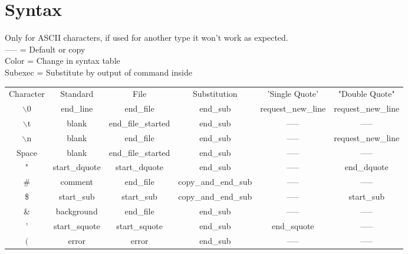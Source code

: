 \documentclass[12pt,a4paper]{report}
\begin{document}
\part{Syntax}
\noindent Only for ASCII characters, if used for another type it won't work as expected.\\
----- = Default or copy\\
Color = Change in syntax table\\
\textcolor[HTML]{C500FF}{Subexec} = Substitute by output of command inside
\begin{table}[H]
\begin{tabular}{ |c|c|c|c|c|c| }
	\hline
	\rowcolor{lightgray} \multicolumn{6}{|c|}{Syntax Table} \\
	\hline
	Character & Standard & File \cellcolor[HTML]{BEE9F9}& Substitution \cellcolor[HTML]{FFF49C}& 'Single Quote' \cellcolor[HTML]{E1E1E1} & "Double Quote"\cellcolor[HTML]{C8F3BE} \\
	\hline
	$\backslash$0 & end\_line & end\_file \cellcolor[HTML]{BEE9F9}&  end\_sub \cellcolor[HTML]{FFF49C}& request\_new\_line & request\_new\_line \\
	$\backslash$t & blank & end\_file\_started \cellcolor[HTML]{BEE9F9}&  end\_sub \cellcolor[HTML]{FFF49C}& ----- & ----- \\
	$\backslash$n & blank & end\_file \cellcolor[HTML]{BEE9F9}&  end\_sub \cellcolor[HTML]{FFF49C}& ----- & request\_new\_line \\
	Space & blank & end\_file\_started \cellcolor[HTML]{BEE9F9}&  end\_sub\cellcolor[HTML]{FFF49C} & ----- & ----- \\
	" & start\_dquote \cellcolor[HTML]{C8F3BE}& start\_dquote \cellcolor[HTML]{C8F3BE}&  end\_sub\cellcolor[HTML]{FFF49C} & ----- & end\_dquote \cellcolor[HTML]{C8F3BE}\\
	\# & comment & end\_file \cellcolor[HTML]{BEE9F9}& copy\_and\_end\_sub \cellcolor[HTML]{FFF49C}& ----- & ----- \\
	\$ & start\_sub \cellcolor[HTML]{FFF49C}& start\_sub \cellcolor[HTML]{FFF49C} & copy\_and\_end\_sub \cellcolor[HTML]{FFF49C}& ----- & start\_sub \cellcolor[HTML]{FFF49C} \\
	\& & background & end\_file \cellcolor[HTML]{BEE9F9}&  end\_sub\cellcolor[HTML]{FFF49C} & ----- & ----- \\
	' & start\_squote \cellcolor[HTML]{E1E1E1}& start\_squote \cellcolor[HTML]{E1E1E1}&  end\_sub\cellcolor[HTML]{FFF49C} & end\_squote \cellcolor[HTML]{E1E1E1} & ----- \\
	$($ & error \cellcolor[HTML]{FF0044}& error \cellcolor[HTML]{FF0044} & end\_sub \cellcolor[HTML]{FFF49C}& ----- & ----- \\

\end{tabular}
\end{table}
\end{document}
